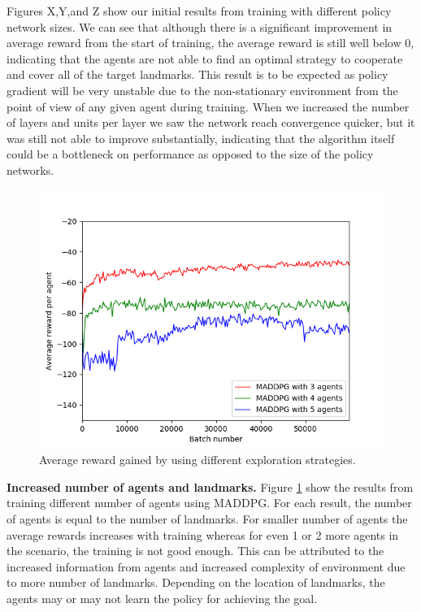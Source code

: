 \documentclass{article}
\begin{document}
Figures X,Y,and Z show our initial results from training with different policy network sizes. We can see that although there is a significant improvement in average reward from the start of training, the average reward is still well below 0, indicating that the agents are not able to find an optimal strategy to cooperate and cover all of the target landmarks. This result is to be expected as policy gradient will be very unstable due to the non-stationary environment from the point of view of any given agent during training. When we increased the number of layers and units per layer we saw the network reach convergence quicker, but it was still not able to improve substantially, indicating that the algorithm itself could be a bottleneck on performance as opposed to the size of the policy networks.

\begin{figure}
\begin{center}
\includegraphics[scale=0.5]{maddpg_3,4,5agents.png}
\end{center}
\caption{Average reward gained by using different exploration strategies.}
\label{fig:avg_reward_multiple_agents}
\end{figure}

\textbf{Increased number of agents and landmarks.} Figure \ref{fig:avg_reward_multiple_agents} show the results from training different number of agents using MADDPG. For each result, the number of agents is equal to the number of landmarks. For smaller number of agents the average rewards increases with training whereas for even 1 or 2 more agents in the scenario, the training is not good enough. This can be attributed to the increased information from agents and increased complexity of environment due to more number of landmarks. Depending on the location of landmarks, the agents may or may not learn the policy for achieving the goal.   
\end{document}
